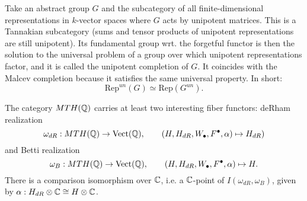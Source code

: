 \begin{exam}
 Take an abstract group $G$ and the subcategory of all finite-dimensional representations in $k$-vector spaces where $G$ acts by unipotent matrices. This is a Tannakian subcategory (sums and tensor products of unipotent representations are still unipotent). Its fundamental group wrt. the forgetful functor is then the solution to the universal problem of a group over which unipotent representations factor, and it is called the unipotent completion of $G$. It coincides with the Malcev completion because it satisfies the same universal property. In short:
\[\mathrm{Rep}^{un}(G) \simeq \mathrm{Rep}(G^{un}).\]
\end{exam}

\begin{exam}
 The category $MTH(\mathbb{Q})$ carries at least two interesting fiber functors: deRham realization
\[\omega_{dR} : MTH(\mathbb{Q}) \to \mathrm{Vect}(\mathbb{Q}),\qquad (H,H_{dR},W_\bullet,F^\bullet,\alpha) \mapsto H_{dR})\]
 and Betti realization
\[\omega_B : MTH(\mathbb{Q}) \to \mathrm{Vect}(\mathbb{Q}),\qquad (H,H_{dR},W_\bullet,F^\bullet,\alpha) \mapsto H.\]
There is a comparison isomorphism over $\mathbb{C}$, i.e. a $\mathbb{C}$-point of $I(\omega_{dR},\omega_B)$,
given by $\alpha : H_{dR} \otimes \mathbb{C} \cong H \otimes \mathbb{C}$.
\end{exam}


% 










